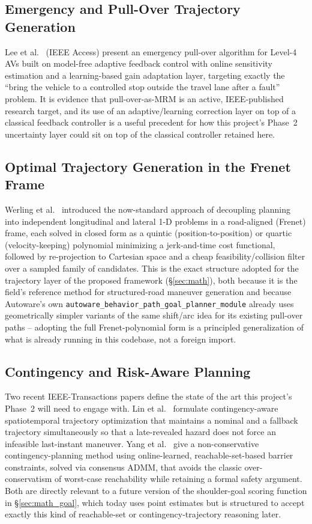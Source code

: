 \documentclass[11pt]{article}
\newcommand{\pkg}[1]{\texttt{#1}}
\begin{document}
\subsection{Emergency and Pull-Over Trajectory Generation}
Lee et al.\ \cite{lee2022pullover} (IEEE Access) present an emergency pull-over algorithm for
Level-4 AVs built on model-free adaptive feedback control with online sensitivity estimation and a
learning-based gain adaptation layer, targeting exactly the ``bring the vehicle to a controlled
stop outside the travel lane after a fault'' problem. It is evidence that pull-over-as-MRM is an
active, IEEE-published research target, and its use of an adaptive/learning correction layer on
top of a classical feedback controller is a useful precedent for how this project's Phase~2
uncertainty layer could sit on top of the classical controller retained here.

\subsection{Optimal Trajectory Generation in the Frenet Frame}
Werling et al.\ \cite{werling2010frenet,werling2011manifolds} introduced the now-standard
approach of decoupling planning into independent longitudinal and lateral 1-D problems in a
road-aligned (Frenet) frame, each solved in closed form as a quintic (position-to-position) or
quartic (velocity-keeping) polynomial minimizing a jerk-and-time cost functional, followed by
re-projection to Cartesian space and a cheap feasibility/collision filter over a sampled family of
candidates. This is the exact structure adopted for the trajectory layer of the proposed framework
(\S\ref{sec:math}), both because it is the field's reference method for structured-road maneuver
generation and because Autoware's own \pkg{autoware\_behavior\_path\_goal\_planner\_module} already
uses geometrically simpler variants of the same shift/arc idea for its existing pull-over paths
-- adopting the full Frenet-polynomial form is a principled generalization of what is already
running in this codebase, not a foreign import.

\subsection{Contingency and Risk-Aware Planning}
Two recent IEEE-Transactions papers define the state of the art this project's Phase~2 will need to
engage with. Lin et al.\ \cite{lin2025contingency} formulate contingency-aware spatiotemporal
trajectory optimization that maintains a nominal and a fallback trajectory simultaneously so that a
late-revealed hazard does not force an infeasible last-instant maneuver. Yang et al.\
\cite{yang2025reachable} give a non-conservative contingency-planning method using
online-learned, reachable-set-based barrier constraints, solved via consensus ADMM, that avoids the
classic over-conservatism of worst-case reachability while retaining a formal safety argument.
Both are directly relevant to a future version of the shoulder-goal scoring function in
\S\ref{sec:math_goal}, which today uses point estimates but is structured to accept exactly this
kind of reachable-set or contingency-trajectory reasoning later.
\end{document}
